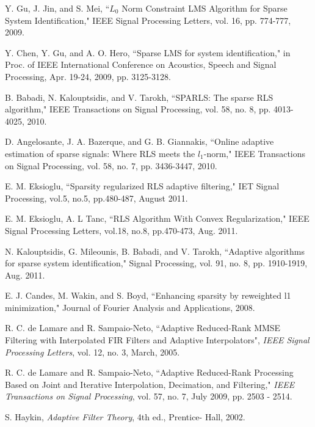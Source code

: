 \documentclass[10pt,onecolumn]{IEEEtran}
\begin{document}
\begin{thebibliography}{10}
{

{\linespread{1}

Y. Gu, J. Jin, and S. Mei, ``$L_0$ Norm Constraint LMS Algorithm for
Sparse System Identification," IEEE Signal Processing Letters, vol.
16, pp. 774-777, 2009.

Y. Chen, Y. Gu, and A. O. Hero, ``Sparse LMS for system
identification," in Proc. of IEEE International Conference on
Acoustics, Speech and Signal Processing, Apr. 19-24, 2009, pp.
3125-3128.

B. Babadi, N. Kalouptsidis, and V. Tarokh, ``SPARLS: The sparse RLS
algorithm," IEEE Transactions on Signal Processing, vol. 58, no. 8,
pp. 4013-4025, 2010.

D. Angelosante, J. A. Bazerque, and G. B. Giannakis, ``Online
adaptive estimation of sparse signals: Where RLS meets the
$l_1$-norm," IEEE Transactions on Signal Processing, vol. 58, no. 7,
pp. 3436-3447, 2010.

E. M. Eksioglu, ``Sparsity regularized RLS adaptive filtering," IET
Signal Processing, vol.5, no.5, pp.480-487, August 2011.

E. M. Eksioglu, A. L Tanc, ``RLS Algorithm With Convex
Regularization," IEEE Signal Processing Letters, vol.18, no.8,
pp.470-473, Aug. 2011.

N. Kalouptsidis, G. Mileounis, B. Babadi, and V. Tarokh, ``Adaptive
algorithms for sparse system identification," Signal Processing,
vol. 91, no. 8, pp. 1910-1919, Aug. 2011.

E. J. Candes, M. Wakin, and S. Boyd, ``Enhancing sparsity
by reweighted l1 minimization," Journal of Fourier Analysis and Applications, 2008.

R. C. de Lamare and R. Sampaio-Neto, ``Adaptive Reduced-Rank MMSE
Filtering with Interpolated FIR Filters and Adaptive Interpolators",
\textit{IEEE Signal Processing Letters}, vol. 12, no. 3, March,
2005.

R. C. de Lamare and R. Sampaio-Neto, ``Adaptive Reduced-Rank
Processing Based on Joint and Iterative Interpolation, Decimation,
and Filtering," \textit{IEEE Transactions on Signal Processing},
vol. 57,  no. 7,  July 2009, pp. 2503 - 2514.

S. Haykin, \textit{ Adaptive Filter Theory}, 4th ed., Prentice-
Hall, 2002.

} }
\end{thebibliography}
\end{document}
